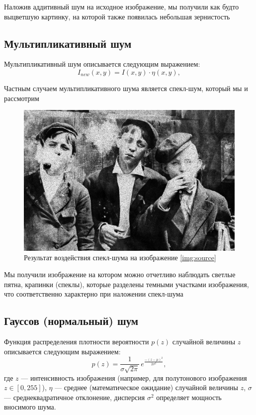Наложив аддитивный шум на исходное изображение, мы получили как будто выцветшую картинку, на которой также появилась небольшая зернистость

\subsection{Мультипликативный шум}
Мультипликативный шум описывается следующим выражением:
\begin{equation}
    I_{new}(x,y) = I(x,y) \cdot \eta(x,y),
\end{equation}

Частным случаем мультипликативного шума является спекл-шум, который мы и рассмотрим

\begin{figure}[ht!!]
    \centering
    \includegraphics[width=\textwidth]{../Noisy_images/Speckle_noise.jpg}
    \caption{Результат воздействия спекл-шума на изображение \ref{img:source}}
    \label{img:speckle_noise}
\end{figure}
\FloatBarrier

Мы получили изображение на котором можно отчетливо наблюдать светлые пятна, крапинки (спеклы), которые разделены темными участками изображения, что соответственно характерно при наложении спекл-шума

\subsection{Гауссов (нормальный) шум}
Функция распределения плотности вероятности
$p(z)$ случайной величины $z$ описывается следующим выражением:
\begin{equation}
    p(z)= \frac{1}{\sigma\sqrt{2\pi}}\, e^{\frac{-(z-\mu)^2}{2\sigma^2}},
\end{equation}
где $z$ — интенсивность изображения (например, для полутонового изображения $z \in [0,255]$), $\eta$ — среднее (математическое ожидание) случайной величины $z$, $\sigma$ — среднеквадратичное отклонение, дисперсия $\sigma^2$ определяет мощность вносимого шума.


